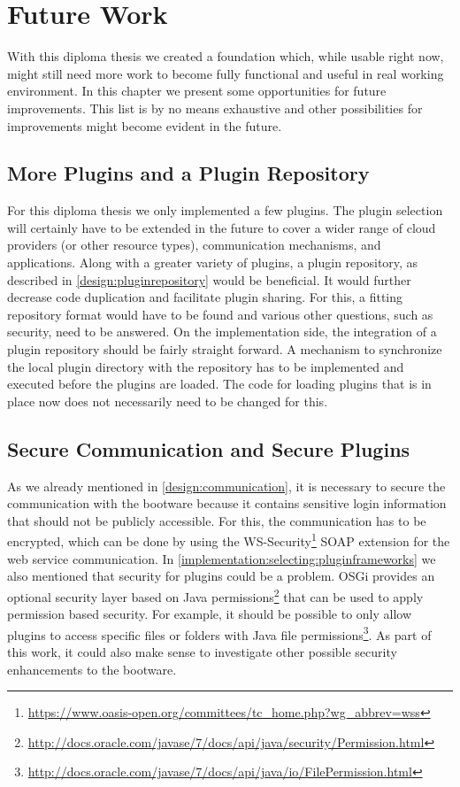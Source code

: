 \chapter{Future Work}
\label{future}

With this diploma thesis we created a foundation which, while usable right now, might still need more work to become fully functional and useful in real working environment.
In this chapter we present some opportunities for future improvements.
This list is by no means exhaustive and other possibilities for improvements might become evident in the future.

\section{More Plugins and a Plugin Repository}

For this diploma thesis we only implemented a few plugins.
The plugin selection will certainly have to be extended in the future to cover a wider range of cloud providers (or other resource types), communication mechanisms, and applications.
Along with a greater variety of plugins, a plugin repository, as described in \autoref{design:pluginrepository} would be beneficial.
It would further decrease code duplication and facilitate plugin sharing.
For this, a fitting repository format would have to be found and various other questions, such as security, need to be answered.
On the implementation side, the integration of a plugin repository should be fairly straight forward.
A mechanism to synchronize the local plugin directory with the repository has to be implemented and executed before the plugins are loaded.
The code for loading plugins that is in place now does not necessarily need to be changed for this.

\section{Secure Communication and Secure Plugins}

As we already mentioned in \autoref{design:communication}, it is necessary to secure the communication with the bootware because it contains sensitive login information that should not be publicly accessible.
For this, the communication has to be encrypted, which can be done by using the WS-Security\footnote{\url{https://www.oasis-open.org/committees/tc_home.php?wg_abbrev=wss}} SOAP extension for the web service communication.
In \autoref{implementation:selecting:pluginframeworks} we also mentioned that security for plugins could be a problem.
OSGi provides an optional security layer based on Java permissions\footnote{\url{http://docs.oracle.com/javase/7/docs/api/java/security/Permission.html}} that can be used to apply permission based security.
For example, it should be possible to only allow plugins to access specific files or folders with Java file permissions\footnote{\url{http://docs.oracle.com/javase/7/docs/api/java/io/FilePermission.html}}.
As part of this work, it could also make sense to investigate other possible security enhancements to the bootware.

